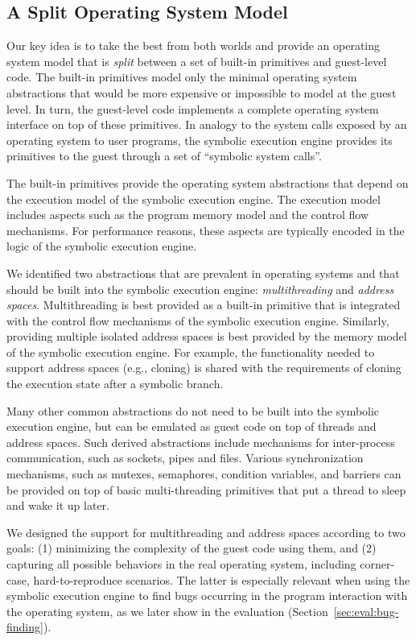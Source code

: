 \subsection{A Split Operating System Model}
\label{sec:cloud9:approach}

Our key idea is to take the best from both worlds and provide an operating system model that is \emph{split} between a set of built-in primitives and guest-level code.
%
The built-in primitives model only the minimal operating system abstractions that would be more expensive or impossible to model at the guest level.
%
In turn, the guest-level code implements a complete operating system interface on top of these primitives.
%
In analogy to the system calls exposed by an operating system to user programs, the symbolic execution engine provides its primitives to the guest through a set of ``symbolic system calls''.

The built-in primitives provide the operating system abstractions that depend on the execution model of the symbolic execution engine.
%
The execution model includes aspects such as the program memory model and the control flow mechanisms.
%
For performance reasons, these aspects are typically encoded in the logic of the symbolic execution engine.

We identified two abstractions that are prevalent in operating systems and that should be built into the symbolic execution engine: \emph{multithreading} and \emph{address spaces}.
%
Multithreading is best provided as a built-in primitive that is integrated with the control flow mechanisms of the symbolic execution engine.
%
Similarly, providing multiple isolated address spaces is best provided by the memory model of the symbolic execution engine.  For example, the functionality needed to support address spaces (e.g., cloning) is shared with the requirements of cloning the execution state after a symbolic branch.

Many other common abstractions do not need to be built into the symbolic execution engine, but can be emulated as guest code on top of threads and address spaces.
%
Such derived abstractions include mechanisms for inter-process communication, such as sockets, pipes and files.
%
Various synchronization mechanisms, such as mutexes, semaphores, condition variables, and barriers can be provided on top of basic multi-threading primitives that put a thread to sleep and wake it up later.

We designed the support for multithreading and address spaces according to two goals: (1) minimizing the complexity of the guest code using them, and (2) capturing all possible behaviors in the real operating system, including corner-case, hard-to-reproduce scenarios.
%
The latter is especially relevant when using the symbolic execution engine to find bugs occurring in the program interaction with the operating system, as we later show in the evaluation (Section~\ref{sec:eval:bug-finding}).


